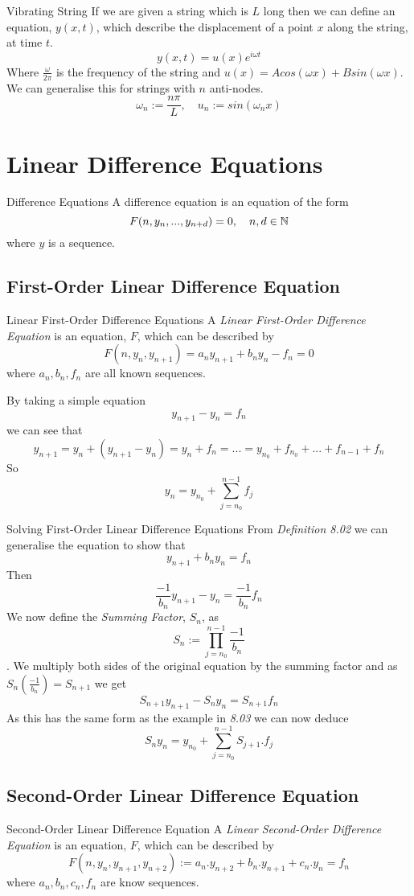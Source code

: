 \documentclass[11pt,a4paper]{article}
\begin{document}
\subtitle{Theorem 7.02 - }{Vibrating String}
If we are given a string which is $L$ long then we can define an equation, $y(x,t)$, which describe the displacement of a point $x$ along the string, at time $t$. $$y(x,t) = u(x)e^{i\omega t}$$
Where $\frac{\omega}{2\pi}$ is the frequency of the string and $u(x) = Acos(\omega x) + Bsin(\omega x)$. \\
We can generalise this for strings with $n$ anti-nodes. $$\omega_n := \frac{n\pi}{L},\quad u_n := sin(\omega_nx)$$

\section{Linear Difference Equations}

\subtitle{Definition 8.01 - }{Difference Equations}
A difference equation is an equation of the form $$F(n, y_n, ... , y_{n+d}) = 0,\quad n,d \in \mathbb{N}$$
where $y$ is a sequence.\\

\subsection{First-Order Linear Difference Equation}
\subtitle{Definition 8.02 - }{Linear First-Order Difference Equations}
A \textit{Linear First-Order Difference Equation} is an equation, $F$, which can be described by $$F(n, y_n, y_{n+1}) = a_ny_{n+1} + b_ny_n - f_n = 0$$
where $a_n, b_n, f_n$ are all known sequences. \\

\subtitle{Example 8.03}{}
By taking a simple equation $$y_{n+1} - y_n = f_n$$
we can see that $$y_{n+1} = y_n +(y_{n+1} - y_n) = y_n + f_n = ... = y_{n_0} +f_{n_0} + ... + f_{n-1} + f_n$$
So $$y_n = y_{n_0} + \sum_{j = n_0}^{n-1} f_j$$

\subtitle{Theorem 8.04 - }{Solving First-Order Linear Difference Equations}
From \textit{Definition 8.02} we can generalise the equation to show that $$y_{n+1} + b_ny_n = f_n$$
Then $$\frac{-1}{b_n}y_{n+1}-y_n = \frac{-1}{b_n}f_n$$
We now define the \textit{Summing Factor}, $S_n$, as $$S_n :=\prod_{j={n_0}}^{n-1}\frac{-1}{b_n}$$.
We multiply both sides of the original equation by the summing factor and as $S_n(\frac{-1}{b_n})=S_{n+1}$ we get $$S_{n+1}y_{n+1} - S_ny_n = S_{n+1}f_n$$
As this has the same form as the example in \textit{8.03} we can now deduce $$S_ny_n = y_{n_0} + \sum_{j={n_0}}^{n-1}S_{j+1}.f_j$$

\subsection{Second-Order Linear Difference Equation}
%
\subtitle{Definition 8.05 - }{Second-Order Linear Difference Equation}
A \textit{Linear Second-Order Difference Equation} is an equation, $F$, which can be described by
$$F(n, y_n, y_{n+1}, y_{n+2}) := a_n.y_{n+2} + b_n.y_{n+1} +c_n.y_n = f_n$$
where $a_n, b_n, c_n, f_n$ are know sequences. \\
\end{document}
